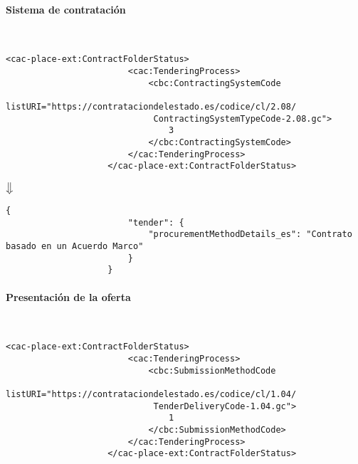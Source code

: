             \paragraph{Sistema de contratación} \mbox{}\\
                \begin{lstlisting}[language=lXML]
                    <cac-place-ext:ContractFolderStatus>
                        <cac:TenderingProcess>
                            <cbc:ContractingSystemCode
                             listURI="https://contrataciondelestado.es/codice/cl/2.08/
                             ContractingSystemTypeCode-2.08.gc">
                                3
                            </cbc:ContractingSystemCode>
                        </cac:TenderingProcess>
                    </cac-place-ext:ContractFolderStatus>
                \end{lstlisting}
                
                \begin{center}
                    $\big\Downarrow$
                \end{center}
                
                \begin{lstlisting}[language=lJSON]
                    {
                        "tender": {
                            "procurementMethodDetails_es": "Contrato basado en un Acuerdo Marco"
                        }
                    }
                \end{lstlisting}
                
            \paragraph{Presentación de la oferta} \mbox{}\\
                \begin{lstlisting}[language=lXML]
                    <cac-place-ext:ContractFolderStatus>
                        <cac:TenderingProcess>
                            <cbc:SubmissionMethodCode
                             listURI="https://contrataciondelestado.es/codice/cl/1.04/
                             TenderDeliveryCode-1.04.gc">
                                1
                            </cbc:SubmissionMethodCode>
                        </cac:TenderingProcess>
                    </cac-place-ext:ContractFolderStatus>
                \end{lstlisting}
                

